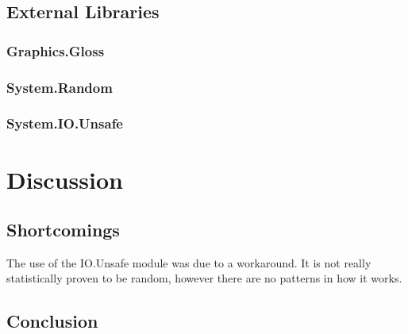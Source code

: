 \documentclass[12pt, a4paper]{article}
\begin{document}
\subsection{External Libraries}
\subsubsection{Graphics.Gloss}

\subsubsection{System.Random}

\subsubsection{System.IO.Unsafe}


\newpage
\section{Discussion}
\subsection{Shortcomings}
The use of the IO.Unsafe module was due to a workaround. It is not really statistically proven to be random, however there are no patterns in how it works.

\newpage
\subsection{Conclusion}
\end{document}
